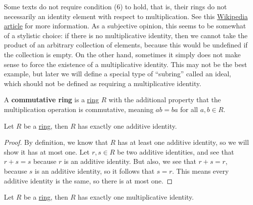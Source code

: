 \documentclass{scrartcl}
\begin{document}
\begin{definition}[Ring]
    Some texts do not require condition (6) to hold, that is, their rings do not necessarily an identity element with
    respect to multiplication.
    See this \href{https://en.wikipedia.org/wiki/Ring_(mathematics)#Notes_on_the_definition}{Wikipedia article} for
    more information.
    As a subjective opinion, this seems to be somewhat of a stylistic choice: if there is no multiplicative identity,
    then we cannot take the product of an arbitrary collection of elements, because this would be undefined if the
    collection is empty.
    On the other hand, sometimes it simply does not make sense to force the existence of a multiplicative identity.
    This may not be the best example, but later we will define a special type of ``subring'' called an ideal, which
    should not be defined as requiring a multiplicative identity.
\end{definition}

\begin{definition}
    \label{def:commutative ring}

    A \textbf{commutative ring} is a \hyperref[def:ring]{ring} $R$ with the additional property that the multiplication
    operation is commutative, meaning $ab=ba$ for all $a,b\in R$.
\end{definition}

\begin{proposition}
    \label{prop:unique additive identity}
    Let $R$ be a \hyperref[def:ring]{ring}, then $R$ has exactly one additive identity.
\end{proposition}

\begin{proof}
    By definition, we know that $R$ has at least one additive identity, so we will show it has at most one.
    Let $r,s\in R$ be two additive identities, and see that $r+s=s$ because $r$ is an additive identity.
    But also, we see that $r+s=r$, because $s$ is an additive identity, so it follows that $s=r$.
    This means every additive identity is the same, so there is at most one.
\end{proof}

\begin{proposition}
    \label{prop:unique multiplicative identity}
    Let $R$ be a \hyperref[def:ring]{ring}, then $R$ has exactly one multiplicative identity.
\end{proposition}
\end{document}
